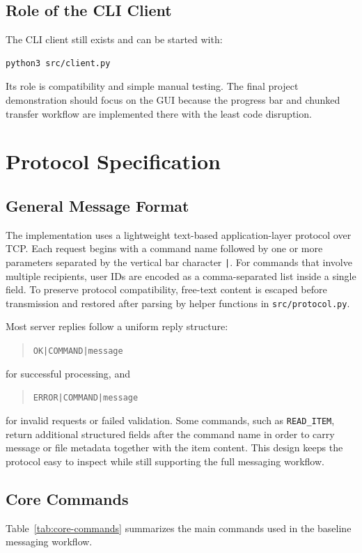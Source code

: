 \documentclass[conference]{IEEEtran}
\begin{document}
\subsection{Role of the CLI Client}
The CLI client still exists and can be started with:
\begin{verbatim}
python3 src/client.py
\end{verbatim}
Its role is compatibility and simple manual testing. The final project demonstration should focus on the GUI because the progress bar and chunked transfer workflow are implemented there with the least code disruption.

\vspace{0.7\baselineskip}
\section{Protocol Specification}
\subsection{General Message Format}
The implementation uses a lightweight text-based application-layer protocol over TCP. Each request begins with a command name followed by one or more parameters separated by the vertical bar character \texttt{|}. For commands that involve multiple recipients, user IDs are encoded as a comma-separated list inside a single field. To preserve protocol compatibility, free-text content is escaped before transmission and restored after parsing by helper functions in \texttt{src/protocol.py}.

Most server replies follow a uniform reply structure:
\begin{quote}
	\texttt{OK|COMMAND|message}
\end{quote}
for successful processing, and
\begin{quote}
	\texttt{ERROR|COMMAND|message}
\end{quote}
for invalid requests or failed validation. Some commands, such as \texttt{READ\_ITEM}, return additional structured fields after the command name in order to carry message or file metadata together with the item content. This design keeps the protocol easy to inspect while still supporting the full messaging workflow.

\subsection{Core Commands}
Table~\ref{tab:core-commands} summarizes the main commands used in the baseline messaging workflow.
\end{document}
